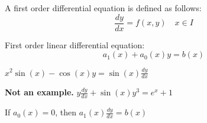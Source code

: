 
\begin{definition}
	A first order differential equation is defined as follows: 
\[\frac{dy}{dx} = f(x,y) \quad x \in I\]
\end{definition}
First order linear differential equation: \[a_1(x) + a_0(x)y = b(x)\]

\begin{example}
	$x^2 \sin(x) - \cos(x)y = \sin(x) \frac{dy}{dx}$
\end{example}

\textbf{Not an example. } $y \frac{dy}{dx} + \sin(x)y^3 = e^x + 1$

\begin{note}
	If $a_0(x) = 0$, then $a_1(x) \frac{dy}{dx} = b(x)$
\end{note}
